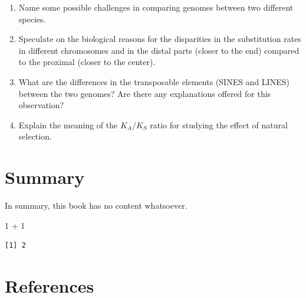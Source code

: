 \documentclass[
  letterpaper,
  DIV=11,
  numbers=noendperiod]{scrreprt}
\newenvironment{Shaded}{\begin{snugshade}}{\end{snugshade}}
\newcommand{\DecValTok}[1]{\textcolor[rgb]{0.68,0.00,0.00}{#1}}
\newcommand{\SpecialCharTok}[1]{\textcolor[rgb]{0.37,0.37,0.37}{#1}}
\newlength{\cslhangindent}
\newlength{\cslentryspacingunit} %
\newenvironment{CSLReferences}[2] %
 {%
  \setlength{\parindent}{0pt}
  \ifodd #1
  \let\oldpar\par
  \def\par{\hangindent=\cslhangindent\oldpar}
  \fi
  \setlength{\parskip}{#2\cslentryspacingunit}
 }%
 {}
\begin{document}
\begin{enumerate}
\def\labelenumi{\arabic{enumi}.}
\item
  Name some possible challenges in comparing genomes between two
  different species.
\item
  Speculate on the biological reasons for the disparities in the
  substitution rates in different chromosomes and in the distal parts
  (closer to the end) compared to the proximal (closer to the center).
\item
  What are the differences in the transposable elements (SINES and
  LINES) between the two genomes? Are there any explanations offered for
  this observation?
\item
  Explain the meaning of the \(K_A/K_S\) ratio for studying the effect
  of natural selection.
\end{enumerate}


\hypertarget{summary}{%
\chapter{Summary}\label{summary}}

In summary, this book has no content whatsoever.

\begin{Shaded}
\begin{Highlighting}[]
\DecValTok{1} \SpecialCharTok{+} \DecValTok{1}
\end{Highlighting}
\end{Shaded}

\begin{verbatim}
[1] 2
\end{verbatim}


\hypertarget{references}{%
\chapter*{References}\label{references}}


\hypertarget{refs}{}
\begin{CSLReferences}{0}{0}
\end{CSLReferences}
\end{document}
